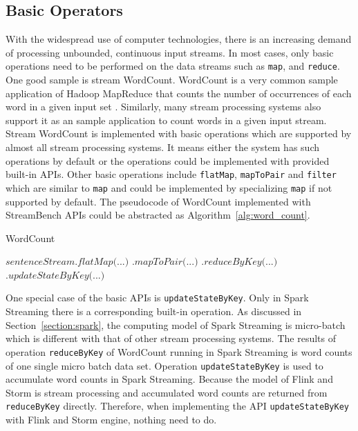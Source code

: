 \subsection{Basic Operators}
\label{sub:basic_operator}

With the widespread use of computer technologies, there is an increasing demand of processing unbounded, continuous input streams. In most cases, only basic operations need to be performed on the data streams such as \texttt{map}, and \texttt{reduce}. One good sample is stream WordCount. WordCount is a very common sample application of Hadoop MapReduce that counts the number of occurrences of each word in a given input set \cite{MapReduce}. Similarly, many stream processing systems also support it as an sample application to count words in a  given input stream. Stream WordCount is implemented with basic operations which are supported by almost all stream processing systems. It means either the system has such operations by default or the operations could be implemented with provided built-in APIs. Other basic operations include \texttt{flatMap}, \texttt{mapToPair} and \texttt{filter} which are similar to \texttt{map} and could be implemented by specializing \texttt{map} if not supported by default. The pseudocode of WordCount implemented with StreamBench APIs could be abstracted as Algorithm~\ref{alg:word_count}.

\begin{algorithm}
\caption{WordCount}\label{euclid}
\label{alg:word_count}
\begin{algorithmic}[1]
\State $\textit{sentenceStream.flatMap(...)}$
\State \hspace{2.6cm} $\textit{.mapToPair(...)}$
\State \hspace{2.6cm} $\textit{.reduceByKey(...)}$
\State \hspace{2.6cm} $\textit{.updateStateByKey(...)}$

\end{algorithmic}
\end{algorithm}

One special case of the basic APIs is \texttt{updateStateByKey}. Only in Spark Streaming there is a corresponding built-in operation. As discussed in Section~\ref{section:spark}, the computing model of Spark Streaming is micro-batch which is different with that of other stream processing systems. The results of operation \texttt{reduceByKey} of WordCount running in Spark Streaming is word counts of one single micro batch data set. Operation \texttt{updateStateByKey} is used to accumulate word counts in Spark Streaming. Because the model of Flink and Storm is stream processing and accumulated word counts are returned from \texttt{reduceByKey} directly. Therefore, when implementing the API \texttt{updateStateByKey} with Flink and Storm engine, nothing need to do. 

